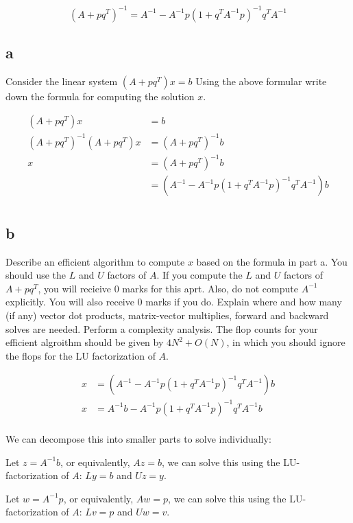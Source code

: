 \documentclass[11pt]{article}
\begin{document}
\[ (A + pq^T)^{-1} = A^{-1} - A^{-1} p (1 + q^T A^{-1} p)^{-1} q^{T} A^{-1} \]

\subsection{a}

Consider the linear system $(A + pq^T) x = b$ Using the above formular write down the formula for computing the solution $x$.

\begin{align*}
  (A + pq^T) x &= b \\
  (A + pq^T)^{-1} (A + pq^T) x &= (A + pq^T)^{-1} b \\
  x &= (A + pq^T)^{-1} b \\
  &= (A^{-1} - A^{-1} p (1 + q^T A^{-1} p)^{-1} q^{T} A^{-1}) b \\
\end{align*}

\subsection{b}

Describe an efficient algorithm to compute $x$ based on the formula in part a. You should use the $L$ and $U$ factors of $A$. If you compute the $L$ and $U$ factors of $A + pq^T$, you will recieive 0 marks for this aprt. Also, do not compute $A^{-1}$ explicitly. You will also receive 0 marks if you do. Explain where and how many (if any) vector dot products, matrix-vector multiplies, forward and backward solves are needed. Perform a complexity analysis. The flop counts for your efficient algroithm should be given by $4N^2 + O(N)$, in which you should ignore the flops for the LU factorization of $A$.

\begin{align*}
  x &= (A^{-1} - A^{-1} p (1 + q^T A^{-1} p)^{-1} q^{T} A^{-1}) b \\
  x &= A^{-1} b - A^{-1} p (1 + q^T A^{-1} p)^{-1} q^{T} A^{-1} b \\  
\end{align*}

We can decompose this into smaller parts to solve individually:

Let $z = A^{-1} b$, or equivalently, $Az = b$, we can solve this using the LU-factorization of $A$: $Ly = b$ and $Uz = y$.

Let $w = A^{-1}p$, or equivalently, $Aw = p$, we can solve this using the LU-factorization of $A$: $Lv = p$ and $Uw = v$.
\end{document}
